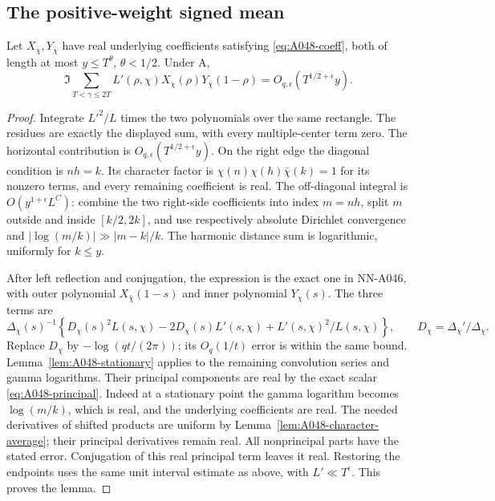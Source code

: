 \subsection*{The positive-weight signed mean}

\begin{lemma}
\label{lem:A048-real-bilinear}
Let \(X_\chi,Y_{\bar\chi}\) have real underlying
coefficients satisfying \eqref{eq:A048-coeff}, both
of length at most \(y\le T^\theta\), \(\theta<1/2\).
Under A,
\[
 \Im\sum_{T<\gamma\le2T}
       L'(\rho,\chi)X_\chi(\rho)Y_{\bar\chi}(1-\rho)
       =O_{q,\epsilon}(T^{1/2+\epsilon}y).
\]
\end{lemma}

\begin{proof}
Integrate \(L'^2/L\) times the two polynomials over
the same rectangle. The residues are exactly the
displayed sum, with every multiple-center term zero.
The horizontal contribution is
\(O_{q,\epsilon}(T^{1/2+\epsilon}y)\).
On the right edge the diagonal condition is \(nh=k\).
Its character factor is
\(\chi(n)\chi(h)\bar\chi(k)=1\) for its nonzero terms,
and every remaining coefficient is real.
The off-diagonal integral is \(O(y^{1+\epsilon}L^C)\):
combine the two right-side coefficients into index
\(m=nh\), split \(m\) outside and inside \([k/2,2k]\),
and use respectively absolute Dirichlet convergence
and \(|\log(m/k)|\gg|m-k|/k\).
The harmonic distance sum is logarithmic, uniformly
for \(k\le y\).

After left reflection and conjugation, the expression
is the exact one in NN-A046, with outer polynomial
\(X_{\bar\chi}(1-s)\) and inner polynomial \(Y_\chi(s)\).
The three terms are
\[
 \Delta_\chi(s)^{-1}
 \left\{D_\chi(s)^2L(s,\chi)
       -2D_\chi(s)L'(s,\chi)
             +L'(s,\chi)^2/L(s,\chi)\right\},
 \qquad D_\chi=\Delta_\chi'/\Delta_\chi .
\]
Replace \(D_\chi\) by \(-\log(qt/(2\pi))\);
its \(O_q(1/t)\) error is within the same bound.
Lemma~\ref{lem:A048-stationary} applies to the
remaining convolution series and gamma logarithms.
Their principal components are real by the exact
scalar \eqref{eq:A048-principal}. Indeed at a
stationary point the gamma logarithm becomes
\(\log(m/k)\), which is real, and the underlying
coefficients are real. The needed derivatives of
shifted products are uniform by
Lemma~\ref{lem:A048-character-average}; their
principal derivatives remain real.
All nonprincipal parts have the stated error.
Conjugation of this real principal term leaves it
real. Restoring the endpoints uses the same unit
interval estimate as above, with \(L'\ll T^\epsilon\).
This proves the lemma.
\end{proof}

